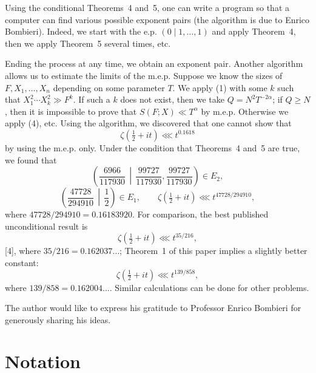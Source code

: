 \documentclass[10pt]{article}
\begin{document}
Using the conditional Theorems~4 and~5, one can write a program so that a computer can find various possible exponent pairs (the algorithm is due to Enrico Bombieri). Indeed, we start with the e.p. $(0\mid1,\ldots,1)$ and apply Theorem~4, then we apply Theorem~5 several times, etc.

Ending the process at any time, we obtain an exponent pair. Another algorithm allows us to estimate the limits of the m.e.p. Suppose we know the sizes of $F,X_1,\ldots,X_n$ depending on some parameter $T$. We apply (1) with some $k$ such that $X_1^2\cdots X_k^2\gg F^k$. If such a $k$ does not exist, then we take $Q=N^2T^{-2\alpha}$; if $Q\geqslant N$, then it is impossible to prove that $S(F;X)\ll T^\alpha$ by m.e.p. Otherwise we apply (4), etc. Using the algorithm, we discovered that one cannot show that
\[
  \zeta\left(\tfrac12+it\right)\lll t^{0.1618}
\]
by using the m.e.p. only. Under the condition that Theorems~4 and~5 are true, we found that
\[
  \left(\frac{6966}{117930}\,\middle|\,
        \frac{99727}{117930},\frac{99727}{117930}\right)\in E_2,
\]
\[
  \left(\frac{47728}{294910}\,\middle|\,\frac12\right)\in E_1,
  \qquad
  \zeta\left(\tfrac12+it\right)\lll t^{47728/294910},
\]
where $47728/294910=0.16183920$. For comparison, the best published unconditional result is
\[
  \zeta\left(\tfrac12+it\right)\lll t^{35/216},
\]
[4], where $35/216=0.162037\ldots$; Theorem~1 of this paper implies a slightly better constant:
\[
  \zeta\left(\tfrac12+it\right)\lll t^{139/858},
\]
where $139/858=0.162004\ldots$. Similar calculations can be done for other problems.

The author would like to express his gratitude to Professor Enrico Bombieri for generously sharing his ideas.


\section{Notation}
\end{document}
